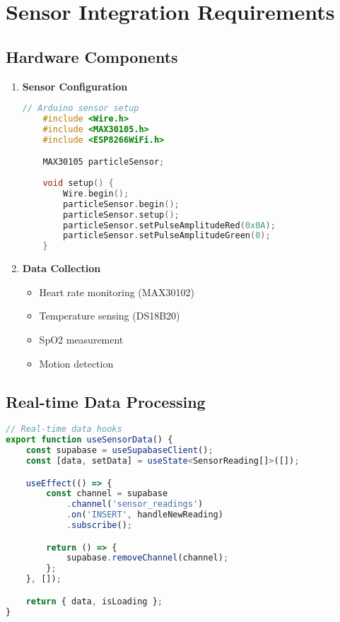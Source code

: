 \section{Sensor Integration Requirements}
\subsection{Hardware Components}
\begin{enumerate}
    \item \textbf{Sensor Configuration}
    \begin{lstlisting}[language=cpp]
    // Arduino sensor setup
    #include <Wire.h>
    #include <MAX30105.h>
    #include <ESP8266WiFi.h>

    MAX30105 particleSensor;
    
    void setup() {
        Wire.begin();
        particleSensor.begin();
        particleSensor.setup();
        particleSensor.setPulseAmplitudeRed(0x0A);
        particleSensor.setPulseAmplitudeGreen(0);
    }
    \end{lstlisting}

    \item \textbf{Data Collection}
    \begin{itemize}
        \item Heart rate monitoring (MAX30102)
        \item Temperature sensing (DS18B20)
        \item SpO2 measurement
        \item Motion detection
    \end{itemize}
\end{enumerate}

\subsection{Real-time Data Processing}
\begin{lstlisting}[language=typescript]
// Real-time data hooks
export function useSensorData() {
    const supabase = useSupabaseClient();
    const [data, setData] = useState<SensorReading[]>([]);

    useEffect(() => {
        const channel = supabase
            .channel('sensor_readings')
            .on('INSERT', handleNewReading)
            .subscribe();

        return () => {
            supabase.removeChannel(channel);
        };
    }, []);

    return { data, isLoading };
}
\end{lstlisting} 